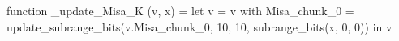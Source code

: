 function _update_Misa_K (v, x) = let v = { v with Misa_chunk_0 = update_subrange_bits(v.Misa_chunk_0, 10, 10, subrange_bits(x, 0, 0)) } in
  v
